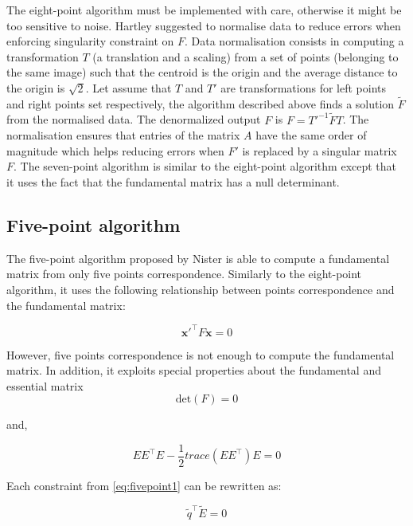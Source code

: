 \documentclass[11pt]{report}
\begin{document}
The eight-point algorithm must be implemented with care, otherwise it might be too sensitive to noise. Hartley suggested to normalise data\cite{DefenceEightPoint} to reduce errors when enforcing singularity constraint on $F$. Data normalisation consists in computing a transformation $T$ (a translation and a scaling) from a set of points (belonging to the same image) such that the centroid is the origin and the average distance to the origin is $\sqrt{2}$. Let assume that $T$ and $T'$ are transformations for left points and right points set respectively, the algorithm described above finds a solution $\widetilde{F}$ from the normalised data. The denormalized output $F$ is $F = T'^{-1}\widetilde{F}T$. The normalisation ensures that entries of the matrix $A$ have the same order of magnitude which helps reducing errors when $F'$ is replaced by a singular matrix $F$.
The seven-point algorithm is similar to the eight-point algorithm except that it uses the fact that the fundamental matrix has a null determinant.

\subsection{Five-point algorithm}

The five-point algorithm proposed by Nister\cite{FivePointNister04} is able to compute a fundamental matrix from only five points correspondence. Similarly to the eight-point algorithm, it uses the following relationship between points correspondence and the fundamental matrix:

\begin{equation}
  \label{eq:fivepoint1}
  \mathbf{x}'^\top F \mathbf{x} = 0
\end{equation}

However, five points correspondence is not enough to compute the fundamental matrix. In addition, it exploits special properties about the fundamental and essential matrix
\begin{equation}
  \label{eq:fivepoint2}
  \text{det}(F) = 0
\end{equation}

and, 

\begin{equation}
  \label{eq:fivepoint3}
  EE^\top E - \frac{1}{2} trace(EE^\top)E = 0 
\end{equation}

Each constraint from \ref{eq:fivepoint1} can be rewritten as: 

\begin{equation}
  \label{eq:fivepoint4}
  \tilde{q}^\top \widetilde{E} = 0
\end{equation}
\end{document}
